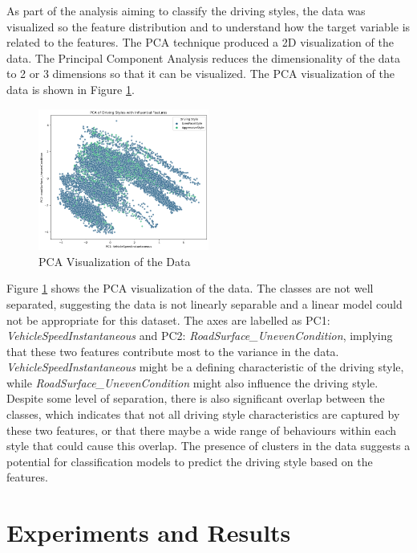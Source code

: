 \documentclass[10pt,journal,compsoc]{IEEEtran}
\begin{document}
As part of the analysis aiming to classify the driving styles, the data was visualized so the feature distribution and to understand how the target variable is related to the features. The PCA technique produced a 2D visualization of the data. The Principal Component Analysis reduces the dimensionality of the data to 2 or 3 dimensions 
so that it can be visualized. The PCA visualization of the data is shown in Figure \ref{fig:pca}.

\begin{figure}
    \centering
    \includegraphics[width=0.5\textwidth]{images/pca_chart.png}
    \caption{PCA Visualization of the Data}
    \label{fig:pca}
\end{figure}

Figure \ref{fig:pca} shows the PCA visualization of the data. The classes are not well separated, suggesting the data is not
linearly separable and a linear model could not be appropriate for this dataset. 
The axes are labelled as PC1: \textit{VehicleSpeedInstantaneous} and PC2: \textit{RoadSurface\_UnevenCondition}, implying that these two features contribute most to the variance in the data.
\textit{VehicleSpeedInstantaneous} might be a defining characteristic of the driving style, while \textit{RoadSurface\_UnevenCondition} might also influence the driving style.
Despite some level of separation, there is also significant overlap between the classes, which indicates that not all driving style characteristics are captured by these two features, or that there
maybe a wide range of behaviours within each style that could cause this overlap.
The presence of clusters in the data suggests a potential for classification models to predict the driving style based on the features.


\section{Experiments and Results}
\end{document}
